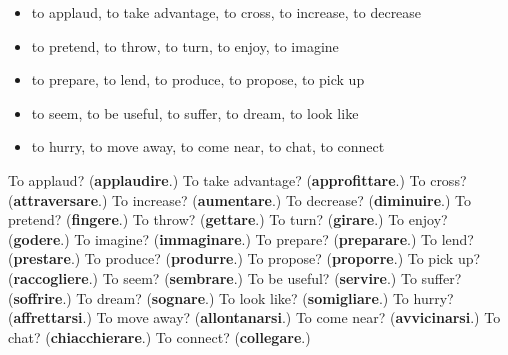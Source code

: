 \begin{itemize}
\raggedright
  \item to applaud, to take advantage, to cross, to increase, to decrease
  \item to pretend, to throw, to turn, to enjoy, to imagine
  \item to prepare, to lend, to produce, to propose, to pick up
  \item to seem, to be useful, to suffer, to dream, to look like
  \item to hurry, to move away, to come near, to chat, to connect
\end{itemize}

\begin{tcolorbox}[breakable,colback=teal!4,colframe=teal!35!black,title={Before you move on}]
To applaud? (\textbf{applaudire}.) To take advantage? (\textbf{approfittare}.) To cross? (\textbf{attraversare}.) To increase? (\textbf{aumentare}.) To decrease? (\textbf{diminuire}.) To pretend? (\textbf{fingere}.) To throw? (\textbf{gettare}.) To turn? (\textbf{girare}.) To enjoy? (\textbf{godere}.) To imagine? (\textbf{immaginare}.) To prepare? (\textbf{preparare}.) To lend? (\textbf{prestare}.) To produce? (\textbf{produrre}.) To propose? (\textbf{proporre}.) To pick up? (\textbf{raccogliere}.) To seem? (\textbf{sembrare}.) To be useful? (\textbf{servire}.) To suffer? (\textbf{soffrire}.) To dream? (\textbf{sognare}.) To look like? (\textbf{somigliare}.) To hurry? (\textbf{affrettarsi}.) To move away? (\textbf{allontanarsi}.) To come near? (\textbf{avvicinarsi}.) To chat? (\textbf{chiacchierare}.) To connect? (\textbf{collegare}.)
\end{tcolorbox}
